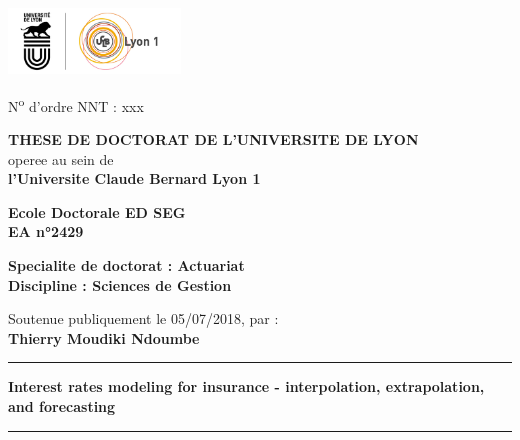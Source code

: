 %
\begin{titlepage}
\setlength{\parindent}{0pt}
\thispagestyle{empty}


\begin{center}
\includegraphics[height=1.75cm]{gfx/logo}
\end{center}


\fontsize{10pt}{12pt}\selectfont
N\textsuperscript{o} d'ordre NNT : xxx

\vspace{0.1cm}

\begin{center}
\fontsize{13pt}{15pt}\selectfont
\textbf{\uppercase{These de doctorat de l'universite de Lyon}}\\
\fontsize{11pt}{13pt}\selectfont
operee au sein de\\
\textbf{l'Universite Claude Bernard Lyon 1}

\vspace{0.2cm}

\textbf{Ecole Doctorale ED SEG\\%
EA n°2429}%

\vspace{0.1cm}

\textbf{Specialite de doctorat : Actuariat\\
Discipline : Sciences de Gestion} %

\vspace{0.1cm}

Soutenue publiquement le 05/07/2018, par :\\
\fontsize{14pt}{16pt}\selectfont
\textbf{Thierry Moudiki Ndoumbe}

\vspace{0.1cm} %

\rule[20pt]{\textwidth}{0.5pt}

\fontsize{20pt}{25pt}\selectfont
\textbf{Interest rates modeling for insurance - interpolation, extrapolation, and forecasting}

\rule{\textwidth}{0.5pt}

\vspace{0.1cm} %
\end{center}


\end{titlepage}
